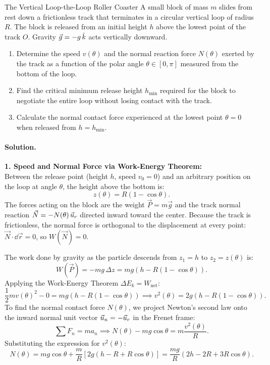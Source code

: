 \begin{workedexample}{The Vertical Loop-the-Loop Roller Coaster}
A small block of mass $m$ slides from rest down a frictionless track that terminates in a circular vertical loop of radius $R$. The block is released from an initial height $h$ above the lowest point of the track $O$. Gravity $\vec{g} = -g\,\hat{k}$ acts vertically downward.
\begin{enumerate}[leftmargin=1.4em,itemsep=3pt]
  \item Determine the speed $v(\theta)$ and the normal reaction force $N(\theta)$ exerted by the track as a function of the polar angle $\theta \in [0, \pi]$ measured from the bottom of the loop.
  \item Find the critical minimum release height $h_{\min}$ required for the block to negotiate the entire loop without losing contact with the track.
  \item Calculate the normal contact force experienced at the lowest point $\theta = 0$ when released from $h = h_{\min}$.
\end{enumerate}

\paragraph{Solution.}
\textbf{1. Speed and Normal Force via Work-Energy Theorem:}\\
Between the release point (height $h$, speed $v_0 = 0$) and an arbitrary position on the loop at angle $\theta$, the height above the bottom is:
\[
z(\theta) = R(1 - \cos\theta).
\]
The forces acting on the block are the weight $\vec{P} = m\vec{g}$ and the track normal reaction $\vec{N} = -N(\theta)\,\vec{u}_r$ directed inward toward the center. Because the track is frictionless, the normal force is orthogonal to the displacement at every point: $\vec{N}\cdot\dd\vec{r} = 0$, so $W(\vec{N}) = 0$.

The work done by gravity as the particle descends from $z_1 = h$ to $z_2 = z(\theta)$ is:
\[
W(\vec{P}) = -mg\,\Delta z = mg\left(h - R(1 - \cos\theta)\right).
\]
Applying the Work-Energy Theorem $\Delta E_k = W_{\text{net}}$:
\[
\frac{1}{2} m v(\theta)^2 - 0 = mg\left(h - R(1 - \cos\theta)\right) \implies v^2(\theta) = 2g\left(h - R(1 - \cos\theta)\right).
\]
To find the normal contact force $N(\theta)$, we project Newton's second law onto the inward normal unit vector $\vec{u}_n = -\vec{u}_r$ in the Frenet frame:
\[
\sum F_n = m a_n \implies N(\theta) - mg\cos\theta = m \frac{v^2(\theta)}{R}.
\]
Substituting the expression for $v^2(\theta)$:
\[
N(\theta) = mg\cos\theta + \frac{m}{R}\left[ 2g(h - R + R\cos\theta) \right] = \frac{mg}{R}\left( 2h - 2R + 3R\cos\theta \right).
\]


\end{workedexample}
